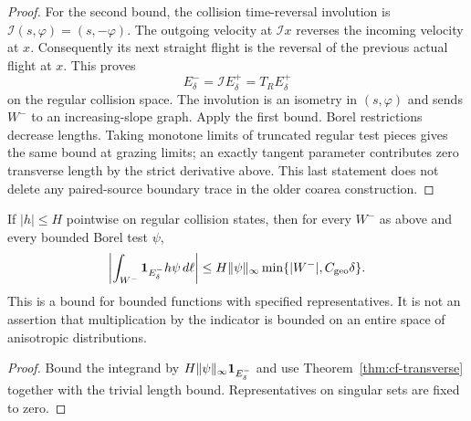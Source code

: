 \begin{proof}
For the second bound, the collision time-reversal involution is
$\mathcal I(s,\varphi)=(s,-\varphi)$. The outgoing velocity at
$\mathcal I x$ reverses the incoming velocity at $x$. Consequently
its next straight flight is the reversal of the previous actual
flight at $x$. This proves
\begin{equation}\label{eq:cf-reversal}
 E_\delta^-=\mathcal I E_\delta^+=T_RE_\delta^+
\end{equation}
on the regular collision space. The involution is an isometry in
$(s,\varphi)$ and sends $W^-$ to an increasing-slope graph.
Apply the first bound. Borel restrictions decrease lengths. Taking
monotone limits of truncated regular test pieces gives the same
bound at grazing limits; an exactly tangent parameter contributes
zero transverse length by the strict derivative above. This last
statement does not delete any paired-source boundary trace in the
older coarea construction.
\end{proof}

\begin{corollary}
\label{cor:cf-multiplier}
If $|h|\le H$ pointwise on regular collision states, then for every
$W^-$ as above and every bounded Borel test $\psi$,
\[
 \left|\int_{W^-}\mathbf1_{E_\delta^-}h\psi\,d\ell\right|
       \le H\|\psi\|_\infty
                   \min\{|W^-|,C_{\rm geo}\delta\}.
\]
This is a bound for bounded functions with specified representatives.
It is not an assertion that multiplication by the indicator is
bounded on an entire space of anisotropic distributions.
\end{corollary}
\begin{proof}
Bound the integrand by $H\|\psi\|_\infty\mathbf1_{E_\delta^-}$ and
use Theorem~\ref{thm:cf-transverse} together with the trivial length
bound. Representatives on singular sets are fixed to zero.
\end{proof}
